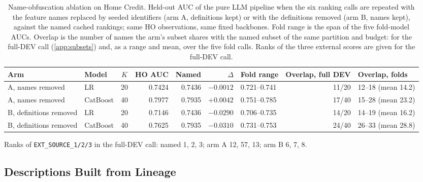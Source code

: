 \documentclass[final,5p,twocolumn]{elsarticle}
\newcommand{\Kfeat}{K}
\begin{document}
\begin{table}[htbp]
\centering
\footnotesize
\begin{threeparttable}
\caption{Name-obfuscation ablation on Home Credit. Held-out AUC of the pure LLM pipeline when the six ranking calls are repeated with the feature names replaced by seeded identifiers (arm A, definitions kept) or with the definitions removed (arm B, names kept), against the named cached rankings; same HO observations, same fixed backbones. Fold range is the span of the five fold-model AUCs. Overlap is the number of names the arm's subset shares with the named subset of the same partition and budget: for the full-DEV call (\ref{app:subsets}) and, as a range and mean, over the five fold calls. Ranks of the three external scores are given for the full-DEV call.}
\label{tab:obfuscation}
\begin{tabular}{@{}llcrrrlrl@{}}
\toprule
Arm & Model & $\Kfeat$ & HO AUC & Named & $\Delta$ & Fold range & Overlap, full DEV & Overlap, folds \\
\midrule
A, names removed & LR & 20 & 0.7424 & 0.7436 & $-0.0012$ & 0.721--0.741 & 11/20 & 12--18 (mean 14.2) \\
A, names removed & CatBoost & 40 & 0.7977 & 0.7935 & $+0.0042$ & 0.751--0.785 & 17/40 & 15--28 (mean 23.2) \\
B, definitions removed & LR & 20 & 0.7146 & 0.7436 & $-0.0290$ & 0.706--0.735 & 14/20 & 14--19 (mean 16.2) \\
B, definitions removed & CatBoost & 40 & 0.7625 & 0.7935 & $-0.0310$ & 0.731--0.753 & 24/40 & 26--33 (mean 28.8) \\
\bottomrule
\end{tabular}
\begin{tablenotes}\footnotesize
\item Ranks of \texttt{EXT\_SOURCE\_1/2/3} in the full-DEV call: named 1, 2, 3; arm A 12, 57, 13; arm B 6, 7, 8.
\end{tablenotes}
\end{threeparttable}
\end{table}

\subsection{Descriptions Built from Lineage}
\label{subsec:mechanical_results}
\end{document}
